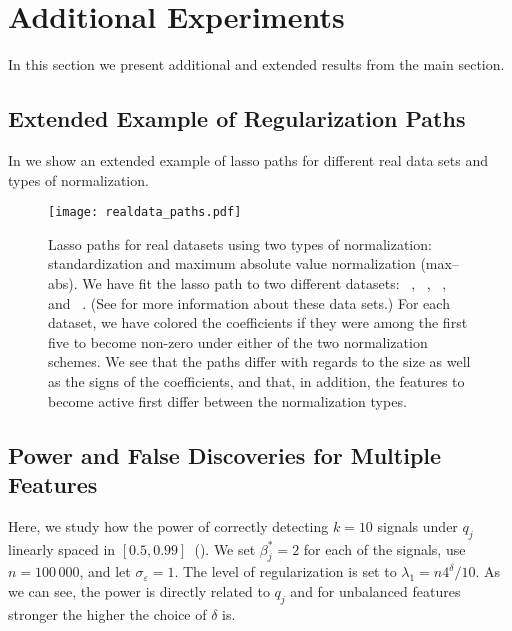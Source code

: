 \section{Additional Experiments}

In this section we present additional and extended results from the main section.

\subsection{Extended Example of Regularization Paths}%
\label{sec:extended-real-data-paths}

In  we show an extended example of lasso paths for different
real data sets and types of normalization.

\begin{figure}[hbpt]
  \centering
  \texttt{[image: realdata\_paths.pdf]}
  \caption{%
    Lasso paths for real datasets using two types of normalization:
    standardization and maximum absolute value normalization (max--abs). We have fit
    the lasso path to two different datasets:
    ~\citep{harrison1978}, ~\citep{golub1999},
    ~\citep{king1995,hirst1994}, and ~\citep{platt1998}. (See 
    for more information about these data sets.) For each
    dataset, we have colored the coefficients if they were among the first five
    to become non-zero under either of the two normalization schemes. We see
    that the paths differ with regards to the size as well as the signs of the
    coefficients, and that, in addition, the features to become active first
    differ between the normalization types.
  }
  \label{fig:realdata-paths-full}
\end{figure}

\subsection{Power and False Discoveries for Multiple Features}%
\label{sec:power-fdr-multiple}

Here, we study how the power of correctly detecting \(k=10\) signals under \(q_j\) linearly
spaced in \([0.5, 0.99]\)~(). We set \(\beta^*_j = 2\) for each of
the signals, use \(n = 100\,000\), and let \(\sigma_\varepsilon = 1\). The level of
regularization is set to \(\lambda_1 = n 4^\delta/10\). As we can see, the power is
directly related to \(q_j\) and for unbalanced features stronger the higher the choice of
\(\delta\) is.

